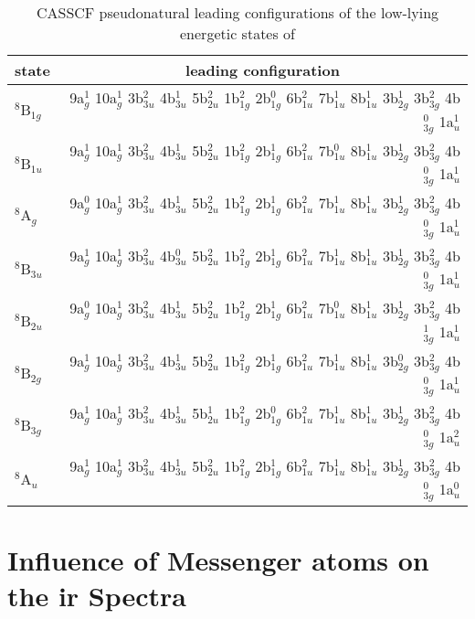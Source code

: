 \begin{refsection}
\begin{table}[]
	\centering
	\caption{CASSCF pseudonatural leading configurations of the low-lying energetic states of }
	\label{a7tbl:leadconfg}
	\begin{tabular}{lr}
		\hline
		state  & \multicolumn{1}{c}{leading configuration}                                                                \\ \hline
 $^8$B$_{1g}$  & 9a$_g^1$ 10a$_g^1$ 3b$_{3u}^2$ 4b$_{3u}^1$ 5b$_{2u}^2$ 1b$_{1g}^2$ 2b$_{1g}^0$ 6b$_{1u}^2$ 7b$_{1u}^1$ 8b$_{1u}^1$ 3b$_{2g}^1$ 3b$_{3g}^2$ 4b$_{3g}^0$ 1a$_u^1$ \\
 $^8$B$_{1u}$  & 9a$_g^1$ 10a$_g^1$ 3b$_{3u}^2$ 4b$_{3u}^1$ 5b$_{2u}^2$ 1b$_{1g}^2$ 2b$_{1g}^1$ 6b$_{1u}^2$ 7b$_{1u}^0$ 8b$_{1u}^1$ 3b$_{2g}^1$ 3b$_{3g}^2$ 4b$_{3g}^0$ 1a$_u^1$ \\
 $^8$A$_{g }$  & 9a$_g^0$ 10a$_g^1$ 3b$_{3u}^2$ 4b$_{3u}^1$ 5b$_{2u}^2$ 1b$_{1g}^2$ 2b$_{1g}^1$ 6b$_{1u}^2$ 7b$_{1u}^1$ 8b$_{1u}^1$ 3b$_{2g}^1$ 3b$_{3g}^2$ 4b$_{3g}^0$ 1a$_u^1$ \\
 $^8$B$_{3u}$  & 9a$_g^1$ 10a$_g^1$ 3b$_{3u}^2$ 4b$_{3u}^0$ 5b$_{2u}^2$ 1b$_{1g}^2$ 2b$_{1g}^1$ 6b$_{1u}^2$ 7b$_{1u}^1$ 8b$_{1u}^1$ 3b$_{2g}^1$ 3b$_{3g}^2$ 4b$_{3g}^0$ 1a$_u^1$ \\
 $^8$B$_{2u}$  & 9a$_g^0$ 10a$_g^1$ 3b$_{3u}^2$ 4b$_{3u}^1$ 5b$_{2u}^2$ 1b$_{1g}^2$ 2b$_{1g}^1$ 6b$_{1u}^2$ 7b$_{1u}^0$ 8b$_{1u}^1$ 3b$_{2g}^1$ 3b$_{3g}^2$ 4b$_{3g}^1$ 1a$_u^1$ \\
 $^8$B$_{2g}$  & 9a$_g^1$ 10a$_g^1$ 3b$_{3u}^2$ 4b$_{3u}^1$ 5b$_{2u}^2$ 1b$_{1g}^2$ 2b$_{1g}^1$ 6b$_{1u}^2$ 7b$_{1u}^1$ 8b$_{1u}^1$ 3b$_{2g}^0$ 3b$_{3g}^2$ 4b$_{3g}^0$ 1a$_u^1$ \\
 $^8$B$_{3g}$  & 9a$_g^1$ 10a$_g^1$ 3b$_{3u}^2$ 4b$_{3u}^1$ 5b$_{2u}^1$ 1b$_{1g}^2$ 2b$_{1g}^0$ 6b$_{1u}^2$ 7b$_{1u}^1$ 8b$_{1u}^1$ 3b$_{2g}^1$ 3b$_{3g}^2$ 4b$_{3g}^0$ 1a$_u^2$ \\
 $^8$A$_{u}$  & 9a$_g^1$ 10a$_g^1$ 3b$_{3u}^2$ 4b$_{3u}^1$ 5b$_{2u}^2$ 1b$_{1g}^2$ 2b$_{1g}^1$ 6b$_{1u}^2$ 7b$_{1u}^1$ 8b$_{1u}^1$ 3b$_{2g}^1$ 3b$_{3g}^2$ 4b$_{3g}^0$ 1a$_u^0$ \\ \hline
	\end{tabular}
\end{table}



\newpage

\section{Influence of Messenger atoms on the \acrshort{ir} Spectra}


\end{refsection}
